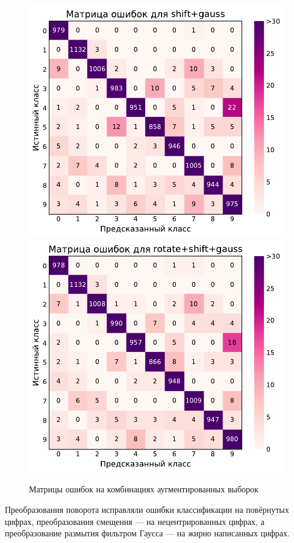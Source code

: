 \documentclass[12pt]{article}
\begin{document}
\begin{figure}[!h]
    \includegraphics[scale=0.6]{5_aug_conf_mat_shift+gauss.pdf}
    \includegraphics[scale=0.6]{5_aug_conf_mat_rotate+shift+gauss.pdf}
    \caption{Матрицы ошибок на комбинациях аугментированных выборок}
    \label{fig:5_aug_conf_mat_2}
\end{figure}

Преобразования поворота исправляли ошибки классификации на повёрнутых цифрах, преобразования смещения --- на нецентрированных цифрах, а преобразование размытия фильтром Гаусса --- на жирно написанных цифрах.
\end{document}
